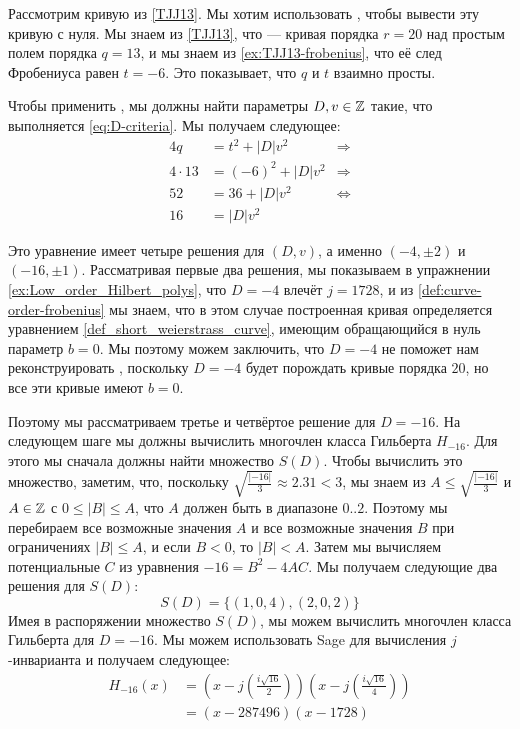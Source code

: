 \begin{example}
 Рассмотрим кривую  \TJJ{} из \examplename{} \ref{TJJ13}. Мы хотим использовать , чтобы вывести эту кривую с нуля. Мы знаем из \examplename{} \ref{TJJ13}, что \TJJ{} — кривая порядка $r=20$ над простым полем порядка $q=13$, и мы знаем из \examplename{} \ref{ex:TJJ13-frobenius}, что её след Фробениуса равен $t=-6$. Это показывает, что $q$ и $t$ взаимно просты. 

Чтобы применить , мы должны найти параметры $D,v\in\mathbb{Z}$ такие, что выполняется \ref{eq:D-criteria}. Мы получаем следующее:
\begin{align*}
4q & = t^2+ |D|v^2 & \Rightarrow \\
4\cdot 13 & = (-6)^2+ |D|v^2 & \Rightarrow \\
52 & = 36 + |D|v^2 & \Leftrightarrow \\
16 & = |D|v^2
\end{align*}

Это уравнение имеет четыре решения для $(D,v)$, а именно $(-4,\pm 2)$ и $(-16,\pm 1)$. Рассматривая первые два решения, мы показываем в упражнении \ref{ex:Low_order_Hilbert_polys}, что $D=-4$ влечёт $j=1728$, и из \ref{def:curve-order-frobenius} мы знаем, что в этом случае построенная кривая определяется уравнением  \ref{def_short_weierstrass_curve}, имеющим обращающийся в нуль параметр $b=0$. Мы поэтому можем заключить, что $D=-4$ не поможет нам реконструировать \TJJ{}, поскольку $D=-4$ будет порождать кривые порядка $20$, но все эти кривые имеют $b=0$.

Поэтому мы рассматриваем третье и четвёртое решение для $D=-16$. На следующем шаге мы должны вычислить многочлен класса Гильберта $H_{-16}$. Для этого мы сначала должны найти множество $S(D)$. Чтобы вычислить это множество, заметим, что, поскольку $\sqrt{\frac{|-16|}{3}}\approx 2.31<3$, мы знаем из $A\leq \sqrt{\frac{|-16|}{3}}$ и $A\in\mathbb{Z}$ с $0\leq |B|\leq A$, что $A$ должен быть в диапазоне $0..2$. Поэтому мы перебираем все возможные значения $A$ и все возможные значения $B$ при ограничениях $|B|\leq A$, и если $B<0$, то $|B|<A$.
Затем мы вычисляем потенциальные $C$ из уравнения $-16 = B^2 -4AC$. Мы получаем следующие два решения для $S(D)$:
$$
S(D)=\{(1,0,4),(2,0,2)\}
$$
Имея в распоряжении множество $S(D)$, мы можем вычислить многочлен класса Гильберта для $D=-16$. Мы можем использовать Sage для вычисления $j$-инварианта и получаем следующее:
\begin{align*}
H_{-16}(x) &= \left(x - j\left(\frac{i\sqrt{16}}{2}\right)\right)
 \left(x - j\left(\frac{i\sqrt{16}}{4}\right)\right) \\
           &= (x- 287496)(x-1728)
\end{align*}


\end{example}
